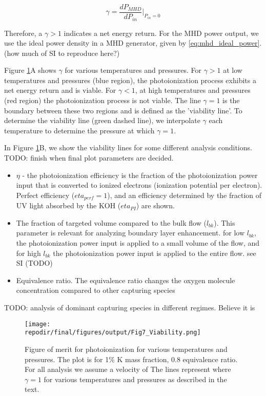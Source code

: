 \begin{equation}
\gamma = \frac{dP_{MHD}}{dP_{in}} \Big|_{P_{in}=0}
\end{equation}

Therefore, a $\gamma > 1$ indicates a net energy return. For the MHD power output, we use the ideal power density in a MHD generator, given by \ref{eq:mhd_ideal_power}. (how much of SI to reproduce here?)

Figure \ref{fig:viability_gamma}A shows $\gamma$ for various temperatures and pressures.  For $\gamma > 1$ at low temperatures and pressures (blue region), the photoionization process exhibits a net energy return and is viable. For $\gamma < 1$, at high temperatures and pressures (red region) the photoionization process is not viable. The line $\gamma = 1$ is the boundary between these two regions and is defined as the 'viability line'. To determine the viability line (green dashed  line), we interpolate $\gamma$ each temperature to determine the pressure at which $\gamma = 1$. 

In Figure \ref{fig:viability_gamma}B, we show the viability lines for some different analysis conditions. TODO: finish when final plot parameters are decided. 

\begin{itemize}
    \item $\eta$ - the photoionization efficiency is the fraction of the photoionization power input that is converted to ionized electrons (ionization potential per electron). Perfect efficiency ($eta_{perf} = 1$), and an efficiency determined by the fraction of UV light absorbed by the KOH ($eta_{PI}$) are shown.
    \item The fraction of targeted volume compared to the bulk flow ($l_{bk}$). This parameter is relevant for analyzing boundary layer enhancement. for low $l_{bk}$, the photoionization power input is applied to a small volume of the flow, and for high $l_{bk}$ the photoionization power input is applied to the entire flow. see SI (TODO)
    \item Equivalence ratio. The equivalence ratio changes the oxygen molecule concentration compared to other capturing species
\end{itemize}


TODO:  analysis of dominant capturing species in different regimes. Believe it is 


\begin{figure}[h]
    \centering
    \texttt{[image: \\repodir/final/figures/output/Fig7\_Viability.png]} 
    \caption{Figure of merit for photoionization for various temperatures and pressures. The plot is for 1\% K mass fraction, 0.8 equivalence ratio. For all analysis we assume a velocity of  The lines represent where $\gamma = 1$ for various temperatures and pressures as described in the text.}   
    \label{fig:viability_gamma}
\end{figure}



